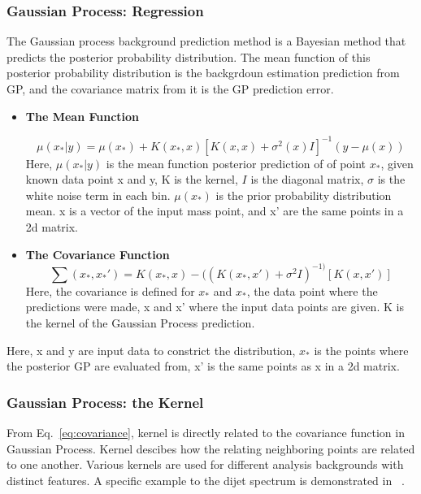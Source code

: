 \subsubsection{Gaussian Process: Regression}

The Gaussian process background prediction method is a Bayesian method that predicts the posterior probability distribution. The mean function of this posterior probability distribution is the backgrdoun estimation prediction from GP, and the covariance matrix from it is the GP prediction error.


    \begin{itemize}

        \item \textbf{The Mean Function}

    \begin{equation}
        \mu(x_{*}|y)  = \mu(x_{*})+ K(x_{*}, x)[K(x, x)+ \sigma^{2}(x)I]^{-1}(y-\mu(x))
    \end{equation}
    Here, $\mu(x_{*}| y) $ is the mean function posterior prediction of of point $x_{*}$, given known data point x and y, K is the kernel, $I$ is the diagonal matrix, $\sigma$ is the white noise term in each bin. $\mu(x_{*})$ is the prior probability distribution mean. x is a vector of the input mass point, and x' are the same points in a 2d matrix.

    \item \textbf{The Covariance Function}
    \begin{equation}
        \sum(x_{*}, x_{*}') = K(x_{*}, x) - ((K(x_{*}, x')+\sigma^{2}I)^{-1)}[K(x, x')]
    \label{eq:covariance}
    \end{equation}  
    Here, the covariance is defined for $x_{*}$ and $x_{*}$, the data point where the predictions were made, x and x' where the input data points are given. K is the kernel of the Gaussian Process prediction.

    \end{itemize}

    Here, x and y are input data to constrict the distribution, $x_{*}$ is the points where the posterior GP are evaluated from, x' is the same points as x in a 2d matrix.

    \subsubsection{Gaussian Process: the Kernel}
\label{sec:kernel}
From Eq.~\ref{eq:covariance}, kernel is directly related to the covariance function in Gaussian Process. Kernel descibes how the relating neighboring points are related to one another. 
Various kernels are used for different analysis backgrounds with distinct features. A specific example to the dijet spectrum is demonstrated in ~\cite{frate2017modeling}.

